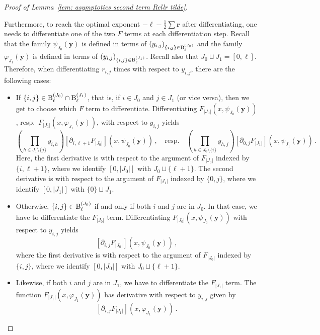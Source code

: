 \documentclass{article}
\theoremstyle{remark}
\newcommand{\abs}[1]{{\left|#1\right|}}
\newcommand{\pairs}{{\rm B}}
\newcommand{\by}{{\mathbf{y}}}
\newcommand{\br}{{\mathbf{r}}}
\begin{document}
\begin{proof}[Proof of Lemma~\ref{lem: asymptotics second term Rellr tilde}]
\begin{itemize}
    Furthermore, to reach the optimal exponent $-\ell-\frac12\sum\br$ after differentiating, one needs to differentiate one of the two $F$ terms at each differentiation step.
    Recall that the family $\psi_{J_0}(\by)$ is defined in terms of $(y_{i,j})_{\{i,j\}\in \pairs_\ell^{(J_0)}}$ and the family $\varphi_{J_1}(\by)$ is defined in terms of $(y_{i,j})_{\{i,j\}\in \pairs_\ell^{(J_1)}}$.
    Recall also that $J_0 \sqcup J_1 = [0,\ell]$.
    Therefore, when differentiating $r_{i,j}$ times with respect to $y_{i,j}$, there are the following cases:
    \begin{itemize}
        \item If $\{i,j\}\in \pairs_\ell^{(J_0)} \cap \pairs_\ell^{(J_1)}$, that is, if $i\in J_0$ and $j\in J_1$ (or vice versa), then we get to choose which $F$ term to differentiate.
        Differentiating $F_{\abs{J_0}}( x,\psi_{J_0}(\by) )$, resp.\ $F_{\abs{J_1}}( x,\varphi_{J_1}(\by) )$, with respect to $y_{i,j}$ yields
        \[
            \left( \prod_{h\in J_1 \setminus \{j\}} y_{i,h} \right) \left[ \partial_{i,\ell+1} F_{\abs{J_0}} \right]( x,\psi_{J_0}(\by) ) \,,
            \quad\text{resp.}\quad
            \left( \prod_{h\in J_0 \setminus \{i\}} y_{h,j} \right) \left[ \partial_{0,j} F_{\abs{J_1}} \right]( x,\psi_{J_1}(\by) ) \,.
        \]
        Here, the first derivative is with respect to the argument of $F_{\abs{J_0}}$ indexed by $\{i,\ell+1\}$, where we identify $[0,\abs{J_0}]$ with $J_0 \sqcup \{\ell+1\}$.
        The second derivative is with respect to the argument of $F_{\abs{J_1}}$ indexed by $\{0,j\}$, where we identify $[0,\abs{J_1}]$ with $\{0\} \sqcup J_1$.
        \item Otherwise, $\{i,j\} \in \pairs_\ell^{(J_0)}$ if and only if both $i$ and $j$ are in $J_0$.
        In that case, we have to differentiate the $F_\abs{J_0}$ term.
        Differentiating $F_{\abs{J_0}}( x,\psi_{J_0}(\by) )$ with respect to $y_{i,j}$ yields
        \[
            \left[ \partial_{i,j} F_{\abs{J_0}} \right]( x,\psi_{J_0}(\by) ) \,,
        \]
        where the first derivative is with respect to the argument of $F_{\abs{J_0}}$ indexed by $\{i,j\}$, where we identify $[0,\abs{J_0}]$ with $J_0 \sqcup \{\ell+1\}$.
        \item Likewise, if both $i$ and $j$ are in $J_1$, we have to differentiate the $F_\abs{J_1}$ term.
        The function $F_{\abs{J_1}}( x,\varphi_{J_1}(\by) )$ has derivative with respect to $y_{i,j}$ given by
        \[
            \left[ \partial_{i,j} F_{\abs{J_1}} \right]( x,\varphi_{J_1}(\by) ) \,.
        \]

\end{itemize}
\end{itemize}
\end{proof}
\end{document}

